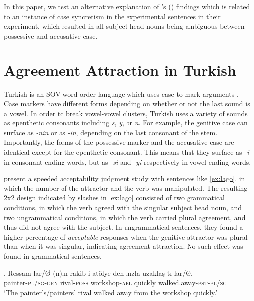 \documentclass[brill,linguex]{glossa}\usepackage[]{graphicx}\usepackage[]{color}
\begin{document}
In this paper, we test an alternative explanation of \citeauthor{LagoEtAl:2019}'s (\citeyear{LagoEtAl:2019}) findings which is related to an instance of case syncretism in the experimental sentences in their experiment, which resulted in all subject head nouns being ambiguous between possessive and accusative case.


\section{Agreement Attraction in Turkish}

Turkish is an SOV word order language which uses case to mark arguments \citep{GokselKerslake:2005,Kornfilt:2011,Kornfilt:2013}. Case markers have different forms depending on whether or not the last sound is a vowel. In order to break vowel-vowel clusters, Turkish uses a variety of sounds as epenthetic consonants including \textit{s}, \textit{y}, or \textit{n}.  For example, the genitive case can surface as \textit{-nin} or as \textit{-in}, depending on the last consonant of the stem. Importantly, the forms of the possessive marker and the accusative case are identical except for the epenthetic consonant. This means that they surface as \textit{-i} in consonant-ending words, but as \textit{-si} and \textit{-yi} respectively in vowel-ending words. 


\citet{LagoEtAl:2019} present a speeded acceptability judgment study with sentences like \ref{ex:lago}, in which the number of the attractor and the verb was manipulated. The resulting 2x2 design indicated by slashes in \ref{ex:lago} consisted of two grammatical conditions, in which the verb agreed with the singular subject head noun, and two ungrammatical conditions, in which the verb carried plural agreement, and thus did not agree with the subject. In ungrammatical sentences, they found a higher percentage of \textit{acceptable} responses when the genitive attractor was plural than when it was singular, indicating agreement attraction. No such effect was found in grammatical sentences.


\ex. \label{ex:lago}
\gll Ressam-lar/\O-(n){\i}n rakib-i at\"{o}lye-den h{\i}zla uzakla\c{s}-t{\i}-lar/\O.\\
painter-\textsc{pl}/\textsc{sg}-\textsc{gen} rival-\textsc{poss} workshop-\textsc{abl} quickly walked.away-\textsc{pst}-\textsc{pl}/\textsc{sg}\\
\glt `The painter's/painters' rival walked away from the workshop quickly.'
\end{document}

